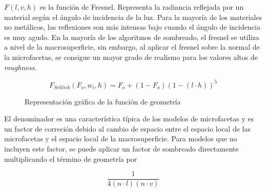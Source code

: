         $F(l, v, h)$ es la funci\'on de Fresnel. Representa la radiancia reflejada por un material seg\'un el \'angulo de incidencia
        de la luz. Para la mayor\'ia de los materiales no met\'alicos, las reflexiones son m\'as intensas bajo cuando el \'angulo
        de incidencia es muy agudo. En la mayor\'ia de los algoritmos de sombreado, el fresnel se utiliza a nivel de la macrosuperficie,
        sin embargo, al aplicar el fresnel sobre la normal de la microfacetas, se consigue un mayor grado de realismo para los valores
        altos de \textit{roughness}.

        $$
        F_{Schlick}(F_o, w_i, h) = F_o + (1 - F_o) (1 - (l\cdot{h}))^5
        $$

        \begin{figure}[H]
            \vspace{0.5cm}
            \centering
            \caption{Representaci\'on gr\'afica de la funci\'on de geometr\'ia}
        \end{figure}
        \singlespacing

        El denominador es una caracter\'istica t\'ipica de los modelos de microfacetas y es un factor de correci\'on debido al cambio
        de espacio entre el espacio local de las microfacetas y el espacio local de la macrosuperficie. Para modelos que no
        incluyen este factor, se puede aplicar un factor de sombreado directamente multiplicando el t\'ermino de geometr\'ia por

        \begin{equation}
        \frac{1}{4(n\cdot{l}) (n\cdot{v})}
        \end{equation}
        \singlespacing



